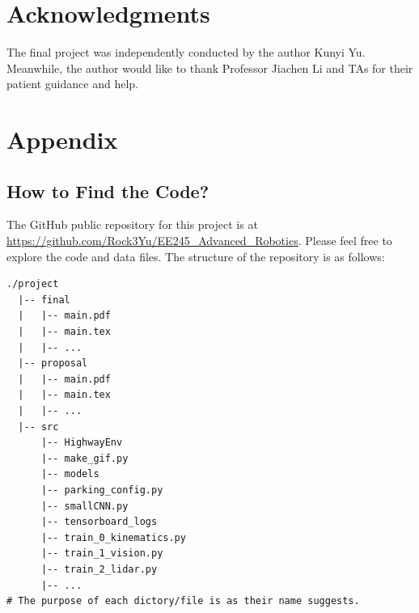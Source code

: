 \documentclass{article}
\begin{document}
\newpage

\section*{Acknowledgments}
The final project was independently conducted by the author Kunyi Yu. Meanwhile, the author would like to thank Professor Jiachen Li and TAs for their patient guidance and help.




\appendix
\section*{Appendix}
\subsection*{How to Find the Code?}
The GitHub public repository for this project is at \url{https://github.com/Rock3Yu/EE245_Advanced_Robotics}. Please feel free to explore the code and data files. The structure of the repository is as follows:

\begin{verbatim}
./project
  |-- final
  |   |-- main.pdf
  |   |-- main.tex
  |   |-- ...
  |-- proposal
  |   |-- main.pdf
  |   |-- main.tex
  |   |-- ...
  |-- src
      |-- HighwayEnv
      |-- make_gif.py
      |-- models
      |-- parking_config.py
      |-- smallCNN.py
      |-- tensorboard_logs
      |-- train_0_kinematics.py
      |-- train_1_vision.py
      |-- train_2_lidar.py
      |-- ...
# The purpose of each dictory/file is as their name suggests.
\end{verbatim}
\end{document}
